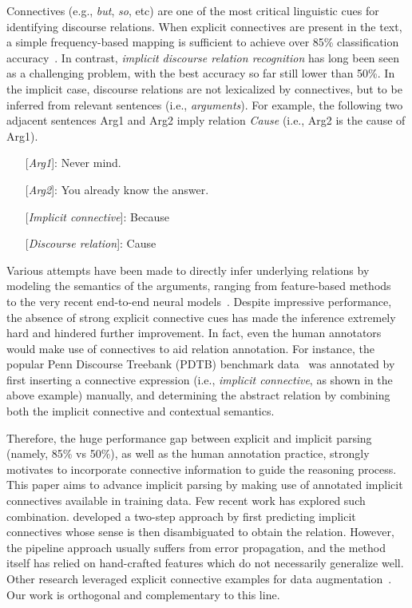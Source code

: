 \documentclass[11pt,a4paper]{article}
\begin{document}
Connectives (e.g., {\it but}, {\it so}, etc) are one of the most critical linguistic cues for identifying discourse relations. When explicit connectives are present in the text, a simple frequency-based mapping is sufficient to achieve over 85\% classification accuracy~\cite{xue-EtAl:2016:CoNLL-ST}. 
In contrast, {\it implicit discourse relation recognition} has long been seen as a challenging problem, with the best accuracy so far still lower than 50\%. In the implicit case, discourse relations are not lexicalized by connectives, but to be inferred from relevant sentences (i.e., {\it arguments}). For example, the following two adjacent sentences Arg1 and Arg2 imply relation {\it Cause} (i.e., Arg2 is the cause of Arg1). 
\begin{itemize}
\setlength\itemsep{0.2pt}
\item[] [{\it Arg1}]: Never mind. 
\item[] [{\it Arg2}]: You already know the answer.
\item[] [{\it Implicit connective}]: Because
\item[] [{\it Discourse relation}]: Cause
\end{itemize}
Various attempts have been made to directly infer underlying relations by modeling the semantics of the arguments, ranging from feature-based methods~\cite{lin2009recognizing,pitler-louis-nenkova:2009:ACLIJCNLP} to the very recent end-to-end neural models~\cite{chen2016implicit,qin2016stacking}. 
Despite impressive performance, the absence of strong explicit connective cues has made the inference extremely hard and hindered further improvement. In fact, even the human annotators would make use of connectives to aid relation annotation. For instance, the popular Penn Discourse Treebank (PDTB) benchmark data~\cite{prasad2008penn} was annotated by first inserting a connective expression (i.e., {\it implicit connective}, as shown in the above example) manually, and determining the abstract relation by combining both the implicit connective and contextual semantics.

Therefore, the huge performance gap between explicit and implicit parsing (namely, 85\% vs 50\%), as well as the human annotation practice, strongly motivates to incorporate connective information to guide the reasoning process. 
This paper aims to advance implicit parsing by making use of annotated implicit connectives available in training data.
Few recent work has explored such combination. 
 developed a two-step approach by first predicting implicit connectives whose sense is then disambiguated to obtain the relation. However, the pipeline approach usually suffers from error propagation, and the method itself has relied on hand-crafted features which do not necessarily generalize well. Other research leveraged explicit connective examples for data augmentation~\cite{rutherford2015improving,braud2015comparing,ji2015closing,braud2016learning}. Our work is orthogonal and complementary to this line.
\end{document}
